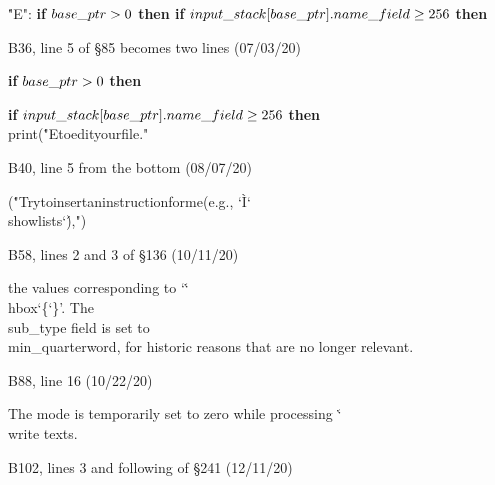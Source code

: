 \ninepoint\noindent\quad
\.{"E"}: {\bf if} $\\{base\_ptr}>0$ {\bf then if}
 $\\{input\_stack}[\\{base\_ptr}].\\{name\_field}\ge256$ {\bf then}

\bugonpage B36, line 5 of \S85 becomes two lines (07/03/20)

\ninepoint\noindent\quad
{\bf if} $\\{base\_ptr}>0$ {\bf then}\par
\noindent\qquad
{\bf if} $\\{input\_stack}[\\{base\_ptr}].\\{name\_field}\ge256$ {\bf then}
\\{print}(\.{"E\]to\]edit\]your\]file."}

\bugonpage B40, line 5 from the bottom (08/07/20)

\ninepoint\noindent\qquad
(\.{"Try\]to\]insert\]an\]instruction\]for\]me\](e.g.,\]%
        \char`\`I\char`\\showlists\char`\'),"})

\bugonpage B58, lines 2 and 3 of \S136 (10/11/20)

\tenpoint\noindent
the values corresponding to `\.{\char`\\hbox\char`\{\char`\}}'.
The \\{sub\_type}
field is set to \\{min\_quarterword}, for historic reasons that are no
longer relevant.

\bugonpage B88, line 16 (10/22/20)

\tenpoint\noindent
The mode is temporarily set to zero while processing \.{\char`\\write} texts.

\bugonpage B102, lines 3 and following of \S241 (12/11/20)

